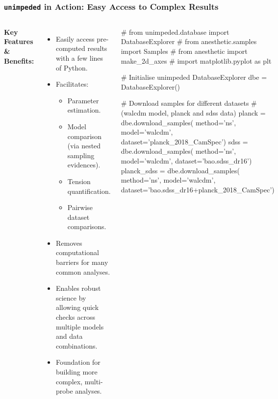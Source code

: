 \documentclass[aspectratio=169]{beamer}
\begin{document}
\begin{frame}[fragile]
    \frametitle{\texttt{unimpeded} in Action: Easy Access to Complex Results}
    \begin{columns}[T]
        \textbf{Key Features \& Benefits:}
        \begin{itemize}
            \item Easily access pre-computed results with a few lines of Python.
            \item Facilitates:
                \begin{itemize}
                    \item Parameter estimation.
                    \item Model comparison (via nested sampling evidences).
                    \item Tension quantification.
                    \item Pairwise dataset comparisons.
                \end{itemize}
            \item Removes computational barriers for many common analyses.
            \item Enables robust science by allowing quick checks across multiple models and data combinations.
            \item Foundation for building more complex, multi-probe analyses.
        \end{itemize}

        \begin{pythonhighlight}
# from unimpeded.database import DatabaseExplorer
# from anesthetic.samples import Samples
# from anesthetic import make_2d_axes
# import matplotlib.pyplot as plt

# Initialise unimpeded DatabaseExplorer
dbe = DatabaseExplorer()

# Download samples for different datasets
# (walcdm model, planck and sdss data)
planck = dbe.download_samples(
    method='ns', model='walcdm',
    dataset='planck_2018_CamSpec')
sdss = dbe.download_samples(
    method='ns', model='walcdm',
    dataset='bao.sdss_dr16')
planck_sdss = dbe.download_samples(
    method='ns', model='walcdm',
    dataset='bao.sdss_dr16+planck_2018_CamSpec')


\end{pythonhighlight}
\end{columns}
\end{frame}
\end{document}
